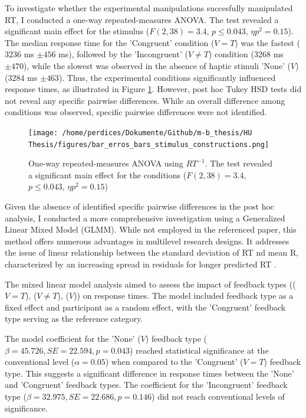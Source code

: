 \documentclass[12pt,oneside,openright]{report}
\begin{document}
To investigate whether the experimental manipulations succesfully manipulated RT, I conducted a one-way repeated-measures ANOVA. The test revealed a significant main effect for the stimulus ($F(2,38) = 3.4$, $p \leq 0.043$, $\eta p^2 = 0.15$). The median response time for the 'Congruent' condition ($V=T$) was the fastest ($3236$ ms $\pm 456$ ms), followed by the 'Incongruent' ($V \neq T$) condition ($3268$ ms $\pm 470$), while the slowest was observed in the absence of haptic stimuli 'None' ($V$) ($3284$ ms $\pm 463$). Thus, the experimental conditions significantly influenced response times, as illustrated in Figure \ref{fig:error}. However, post hoc Tukey HSD tests did not reveal any specific pairwise differences. While an overall difference among conditions was observed, specific pairwise differences were not identified.

\begin{figure}[!ht]
    \centering
    \texttt{[image: /home/perdices/Dokumente/Github/m-b\_thesis/HU Thesis/figures/bar\_erros\_bars\_stimulus\_constructions.png]}
    \caption{One-way repeated-measures ANOVA using $RT^{-1}$. The test revealed a significant main effect for the conditions ($F(2,38) = 3.4$, $p \leq 0.043$, $\eta p^2 = 0.15$)}
    \label{fig:error}
\end{figure}

Given the absence of identified specific pairwise differences in the post hoc analysis, I conducted a more comprehensive investigation using a Generalized Linear Mixed Model (GLMM). While not employed in the referenced paper, this method offers numerous advantages in multilevel research designs. It addresses the issue of linear relationship between the standard deviation of RT nd mean R, characterized by an increasing spread in residuals for longer predicted RT  \parencite{Lo2015-fv}.

The mixed linear model analysis aimed to assess the impact of feedback types (($V=T$), ($V \neq T$), ($V$)) on response times. The model included feedback type as a fixed effect and participant as a random effect, with the 'Congruent' feedback type serving as the reference category.

The model coefficient for the 'None' ($V$) feedback type ($\beta = 45.726, SE = 22.594, p = 0.043$) reached statistical significance at the conventional level ($\alpha =0.05 $) when compared to the 'Congruent' ($V=T$) feedback type. This suggests a significant difference in response times between the 'None' and 'Congruent' feedback types. The coefficient for the 'Incongruent' feedback type ($\beta = 32.975, SE = 22.686, p = 0.146$) did not reach conventional levels of significance.
\end{document}
